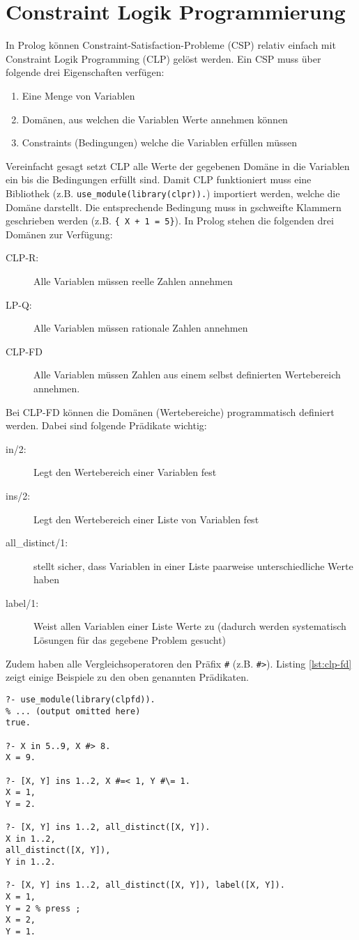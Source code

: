\section{Constraint Logik Programmierung}

In Prolog können Constraint-Satisfaction-Probleme (CSP) relativ einfach mit Constraint Logik Programming (CLP) gelöst werden. Ein CSP muss über folgende drei Eigenschaften verfügen:
\begin{enumerate}
	\item Eine Menge von Variablen
	\item Domänen, aus welchen die Variablen Werte annehmen können
	\item Constraints (Bedingungen) welche die Variablen erfüllen müssen
\end{enumerate}
Vereinfacht gesagt setzt CLP alle Werte der gegebenen Domäne in die Variablen ein bis die Bedingungen erfüllt sind. Damit CLP funktioniert muss eine Bibliothek (z.B. \verb|use_module(library(clpr)).|) importiert werden, welche die Domäne darstellt. Die entsprechende Bedingung muss in gschweifte Klammern geschrieben werden (z.B. \verb|{ X + 1 = 5}|). In Prolog stehen die folgenden drei Domänen zur Verfügung:
\begin{description}
	\item[CLP-R:] Alle Variablen müssen reelle Zahlen annehmen
	\item[LP-Q:] Alle Variablen müssen rationale Zahlen annehmen
	\item[CLP-FD] Alle Variablen müssen Zahlen aus einem selbst definierten Wertebereich annehmen.
\end{description}
Bei CLP-FD können die Domänen (Wertebereiche) programmatisch definiert werden. Dabei sind folgende Prädikate wichtig:
\begin{description}
	\item[in/2:] Legt den Wertebereich einer Variablen fest
	\item[ins/2:] Legt den Wertebereich einer Liste von Variablen fest
	\item[all\_distinct/1:] stellt sicher, dass Variablen in einer Liste paarweise unterschiedliche Werte haben
	\item[label/1:] Weist allen Variablen einer Liste Werte zu (dadurch werden systematisch Lösungen für das gegebene Problem gesucht)
\end{description}
Zudem haben alle Vergleichsoperatoren den Präfix \verb|#| (z.B. \verb|#>|). Listing \ref{lst:clp-fd} zeigt einige Beispiele zu den oben genannten Prädikaten.
\begin{lstlisting}[caption=CLP-FD, label=lst:clp-fd]
?- use_module(library(clpfd)).
% ... (output omitted here)
true.

?- X in 5..9, X #> 8.
X = 9.

?- [X, Y] ins 1..2, X #=< 1, Y #\= 1.
X = 1,
Y = 2.

?- [X, Y] ins 1..2, all_distinct([X, Y]).
X in 1..2,
all_distinct([X, Y]),
Y in 1..2.

?- [X, Y] ins 1..2, all_distinct([X, Y]), label([X, Y]).
X = 1,
Y = 2 % press ;
X = 2,
Y = 1.
\end{lstlisting}